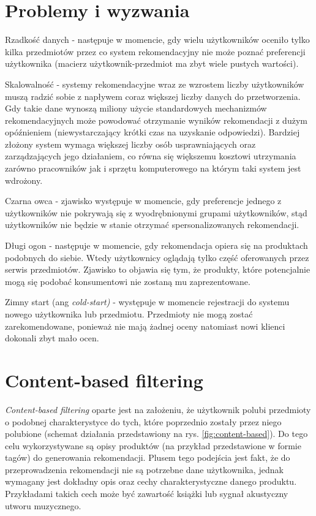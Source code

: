 \section{Problemy i wyzwania}

Rzadkość danych - następuje w momencie, gdy wielu użytkowników oceniło tylko kilka przedmiotów przez co system rekomendacyjny nie może poznać preferencji użytkownika (macierz użytkownik-przedmiot ma zbyt wiele pustych wartości).

Skalowalność - systemy rekomendacyjne wraz ze wzrostem liczby użytkowników muszą radzić sobie z napływem coraz większej liczby danych do przetworzenia. Gdy takie dane wynoszą miliony użycie standardowych mechanizmów rekomendacyjnych może powodować otrzymanie wyników rekomendacji z dużym opóźnieniem (niewystarczający krótki czas na uzyskanie odpowiedzi). Bardziej złożony system wymaga większej liczby osób usprawniających oraz zarządzających jego działaniem, co równa się większemu kosztowi utrzymania zarówno pracowników jak i sprzętu komputerowego na którym taki system jest wdrożony.
    
Czarna owca - zjawisko występuje w momencie, gdy preferencje jednego z użytkowników nie pokrywają się z wyodrębnionymi grupami użytkowników, stąd użytkowników nie będzie w stanie otrzymać spersonalizowanych rekomendacji.

Długi ogon - następuje w momencie, gdy rekomendacja opiera się na produktach podobnych do siebie. Wtedy użytkownicy oglądają tylko część oferowanych przez serwis przedmiotów. Zjawisko to objawia się tym, że produkty, które potencjalnie mogą się podobać konsumentowi nie zostaną mu zaprezentowane.

Zimny start (ang \textit{cold-start)} - występuje w momencie rejestracji do systemu nowego użytkownika lub przedmiotu. Przedmioty nie mogą zostać zarekomendowane, ponieważ nie mają żadnej oceny natomiast nowi klienci dokonali zbyt mało ocen.

\section{Content-based filtering}
\textit{Content-based filtering} oparte jest na założeniu, że użytkownik polubi przedmioty o podobnej charakterystyce do tych, które poprzednio zostały przez niego polubione (schemat działania przedstawiony na rys. \ref{fig:content-based}). Do tego celu wykorzystywane są opisy produktów (na przykład przedstawione w formie tagów) do generowania rekomendacji. Plusem tego podejścia jest fakt, że do przeprowadzenia rekomendacji nie są potrzebne dane użytkownika, jednak wymagany jest dokładny opis oraz cechy charakterystyczne danego produktu. Przykładami takich cech może być zawartość książki lub sygnał akustyczny utworu muzycznego.

